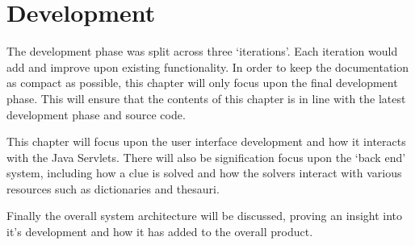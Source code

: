 \chapter{Development}
\label{cha:development}

The development phase was split across three `iterations'. Each iteration would
add and improve upon existing functionality. In order to keep the documentation
as compact as possible, this chapter will only focus upon the final development 
phase. This will ensure that the contents of this chapter is in line with the 
latest development phase and source code.

This chapter will focus upon the user interface development and how it interacts
with the Java Servlets. There will also be signification focus upon the `back 
end' system, including how a clue is solved and how the solvers interact with 
various resources such as dictionaries and thesauri. 

Finally the overall system architecture will be discussed, proving an insight 
into it's development and how it has added to the overall product.

\newpage


\newpage


\newpage


\newpage


\newpage


\newpage


\newpage

